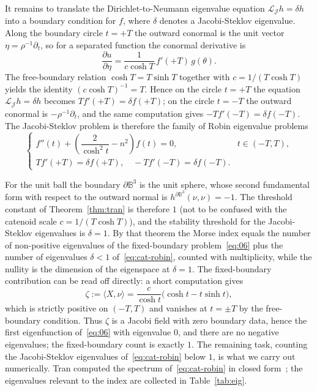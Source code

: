 \documentclass[11pt]{article}
\theoremstyle{definition}
\theoremstyle{plain}
\begin{document}
It remains to translate the Dirichlet-to-Neumann eigenvalue equation $\mathcal{L}_\mathcal{J}h = \delta h$ into a boundary condition for $f$, where $\delta$ denotes a Jacobi-Steklov eigenvalue. Along the boundary circle $t = +T$ the outward conormal is the unit vector $\eta = \rho^{-1}\partial_t$, so for a separated function the conormal derivative is
\begin{equation}
	\frac{\partial u}{\partial \eta} = \frac{1}{c\cosh T}\, f'(+T)\, g(\theta).
\end{equation}
The free-boundary relation $\cosh T = T\sinh T$ together with $c = 1/(T\cosh T)$ yields the identity $(c\cosh T)^{-1} = T$. Hence on the circle $t = +T$ the equation $\mathcal{L}_\mathcal{J}h = \delta h$ becomes $T f'(+T) = \delta f(+T)$; on the circle $t = -T$ the outward conormal is $-\rho^{-1}\partial_t$, and the same computation gives $-T f'(-T) = \delta f(-T)$. The Jacobi-Steklov problem is therefore the family of Robin eigenvalue problems
\begin{equation}\label{eq:cat-robin}
	\begin{cases}
		f''(t) + \left( \dfrac{2}{\cosh^2 t} - n^2 \right) f(t) = 0, & t \in (-T, T), \\[6pt]
		T f'(+T) = \delta f(+T), \quad -T f'(-T) = \delta f(-T).     &
	\end{cases}
\end{equation}

For the unit ball the boundary $\partial\mathbb{B}^3$ is the unit sphere, whose second fundamental form with respect to the outward normal is $h^{\partial\mathbb{B}^3}(\nu,\nu) = -1$. The threshold constant of Theorem~\ref{thm:tran} is therefore $1$ (not to be confused with the catenoid scale $c = 1/(T\cosh T)$), and the stability threshold for the Jacobi-Steklov eigenvalues is $\delta = 1$. By that theorem the Morse index equals the number of non-positive eigenvalues of the fixed-boundary problem~\eqref{eq:06} plus the number of eigenvalues $\delta < 1$ of~\eqref{eq:cat-robin}, counted with multiplicity, while the nullity is the dimension of the eigenspace at $\delta = 1$. The fixed-boundary contribution can be read off directly: a short computation gives
\begin{equation}\label{eq:zeta}
	\zeta := \langle X, \nu \rangle = \frac{c}{\cosh t}\bigl(\cosh t - t\sinh t\bigr),
\end{equation}
which is strictly positive on $(-T,T)$ and vanishes at $t = \pm T$ by the free-boundary condition. Thus $\zeta$ is a Jacobi field with zero boundary data, hence the first eigenfunction of~\eqref{eq:06} with eigenvalue $0$, and there are no negative eigenvalues; the fixed-boundary count is exactly $1$. The remaining task, counting the Jacobi-Steklov eigenvalues of~\eqref{eq:cat-robin} below $1$, is what we carry out numerically. Tran computed the spectrum of~\eqref{eq:cat-robin} in closed form~\cite[Theorem 4.2]{tran01}; the eigenvalues relevant to the index are collected in Table~\ref{tab:eig}.
\end{document}
